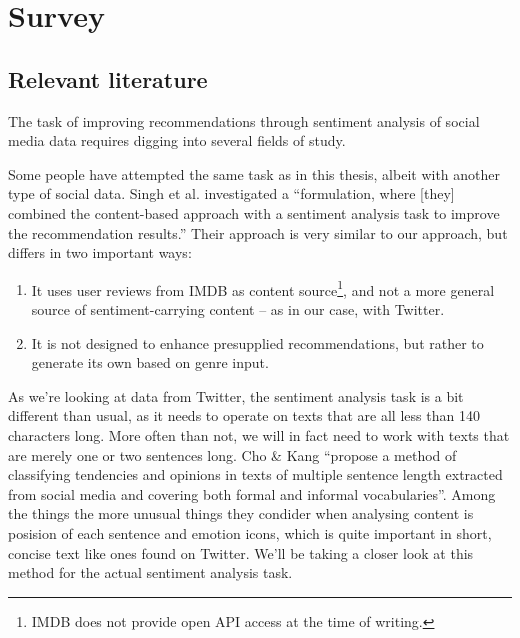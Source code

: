 
\chapter{Survey} %

\label{Chapter2} %




\section{Relevant literature} %
\label{sec:relevant_literature}

The task of improving recommendations through sentiment analysis of social media data requires digging into several fields of study.

Some people have attempted the same task as in this thesis, albeit with another type of social data.
Singh et al. \cite{Singh2011} investigated a ``formulation, where [they] combined the content-based approach with a sentiment analysis task to improve the recommendation results.''
Their approach is very similar to our approach, but differs in two important ways:
\begin{enumerate}
  \item It uses user reviews from IMDB as content source\footnote{IMDB does not provide open API access at the time of writing.}, and not a more general source of sentiment-carrying content -- as in our case, with Twitter.
  \item It is not designed to enhance presupplied recommendations, but rather to generate its own based on genre input.
\end{enumerate}

As we're looking at data from Twitter, the sentiment analysis task is a bit different than usual, as it needs to operate on texts that are all less than 140 characters long. More often than not, we will in fact need to work with texts that are merely one or two sentences long.
Cho \& Kang \cite{ChoKang2012} ``propose a method of classifying tendencies and opinions in texts of multiple sentence length extracted from social media and covering both formal and informal vocabularies''.
Among the things the more unusual things they condider when analysing content is posision of each sentence and emotion icons, which is quite important in short, concise text like ones found on Twitter.
We'll be taking a closer look at this method for the actual sentiment analysis task.


